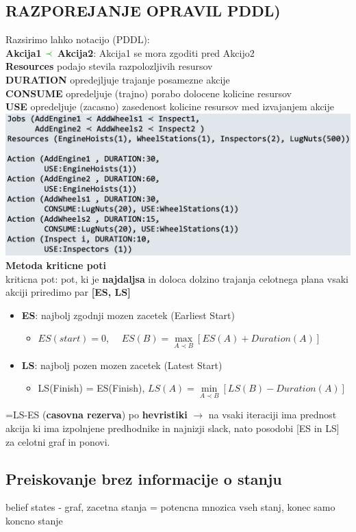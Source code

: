 \subsection{RAZPOREJANJE OPRAVIL PDDL)}
Razsirimo lahko notacijo (PDDL):\\
\textbf{Akcija1 $\green{\prec}$ Akcija2}: Akcija1 se mora zgoditi pred Akcijo2\\
\textbf{Resources} podajo stevila razpolozljivih resursov\\
\textbf{DURATION} opredejljuje trajanje posamezne akcije\\
\textbf{CONSUME} opredeljuje (trajno) porabo dolocene kolicine resursov\\
\textbf{USE} opredeljuje (zacasno) zasedenost kolicine resursov med izvajanjem akcije\\
\includegraphics[width=\columnwidth]{./images/pddl.png}
\textbf{Metoda kriticne poti}\\
kriticna pot: pot, ki je \textbf{najdaljsa} in doloca dolzino trajanja celotnega plana
vsaki akciji priredimo par \textbf{[ES, LS]}
\begin{itemize}[leftmargin=*,noitemsep,topsep=0pt]
    \item \textbf{ES}: najbolj zgodnji mozen zacetek (Earliest Start)
    \begin{itemize}[leftmargin=*,noitemsep,topsep=0pt]
        \item $ES(start) = 0$, $\quad ES(B) = \max\limits_{A \prec B} \left[ ES(A) + Duration(A)\right]$
    \end{itemize}
    \item \textbf{LS}: najbolj pozen mozen zacetek (Latest Start)
    \begin{itemize}[leftmargin=*,noitemsep,topsep=0pt]
        \item LS(Finish) = ES(Finish), $LS(A) = \min\limits_{A\prec B}\left[ LS(B) - Duration(A)\right]$
    \end{itemize}
\end{itemize}
=LS-ES (\textbf{casovna rezerva})
 po \textbf{hevristiki } $\rightarrow$ na vsaki iteraciji ima prednost akcija 
ki ima izpolnjene predhodnike in najnizji slack, nato posodobi [ES in LS] za celotni graf in ponovi.
\subsection{Preiskovanje brez informacije o stanju}
belief states - graf, zacetna stanja = potencna mnozica vseh stanj, konec samo koncno stanje
